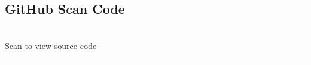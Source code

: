 \subsection*{GitHub Scan Code}
\begin{center}
    \begin{minipage}{0.3\textwidth}
        \centering
         \\[0.2cm]
        \scriptsize\ttfamily Scan to view source code 
    \end{minipage}
\end{center}


\vspace{1cm}
\begin{center}
    \rule{1\textwidth}{1pt} %
\end{center}